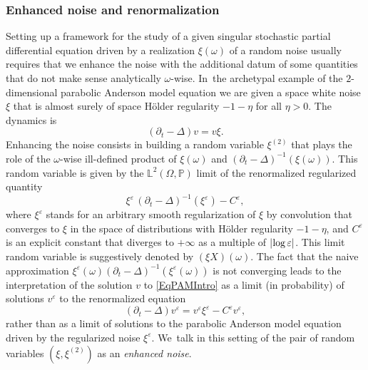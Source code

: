 \documentclass[JEP,XML,SOM,Unicode,published]{cedram}
\theoremstyle{definition}
\let\epsilon\varepsilon
\newcommand{\bbL}{\mathbb{L}}
\begin{document}
\subsubsection{Enhanced noise and renormalization} Setting up a framework for the study of a given singular stochastic partial differential equation driven by a realization $\xi(\omega)$ of a random noise usually requires that we enhance the noise with the additional datum of some quantities that do not make sense analytically $\omega$\nobreakdash-wise. In~the archetypal example of the $2$-dimensional parabolic Anderson model equation we are given a space white noise $\xi$ that is almost surely of space Hölder regularity $-1-\eta$ for all $\eta>0$. The dynamics is
\begin{equation} \label{EqPAMIntro}
(\partial_t-\Delta)v = v\xi.
\end{equation}
Enhancing the noise consists in building a random variable $\xi^{(2)}$ that plays the role of the $\omega$\nobreakdash-wise ill-defined product of $\xi(\omega)$ and $(\partial_t-\Delta)^{-1}(\xi(\omega))$. This random variable is given by the $\bbL^2(\Omega,\mathbb{P})$ limit of the renormalized regularized quantity
\[
\xi^\epsilon \, (\partial_t-\Delta)^{-1}(\xi^\epsilon) - C^\epsilon,
\]
where $\xi^\epsilon$ stands for an arbitrary smooth regularization of $\xi$ by convolution that converges to $\xi$ in the space of distributions with Hölder regularity $-1-\eta$, and $C^\epsilon$ is an explicit constant that diverges to $+\infty$ as a multiple of $\vert\hspace{-0.05cm}\log\epsilon\vert$. This limit random variable is suggestively denoted by $(\xi X)(\omega)$. The fact that the naive approximation $\xi^\epsilon(\omega) (\partial_t-\Delta)^{-1}(\xi^\epsilon(\omega))$ is not converging leads to the interpretation of the solution $v$ to \eqref{EqPAMIntro} as a limit (in probability) of solutions $v^\epsilon$ to the renormalized equation
\[
(\partial_t-\Delta)v^\epsilon = v^\epsilon\xi^\epsilon - C^\epsilon v^\epsilon,
\]
rather than as a limit of solutions to the parabolic Anderson model equation driven by the regularized noise $\xi^\epsilon$. We~talk in this setting of the pair of random variables $(\xi, \xi^{(2)})$ as an \emph{enhanced noise}.
\end{document}
